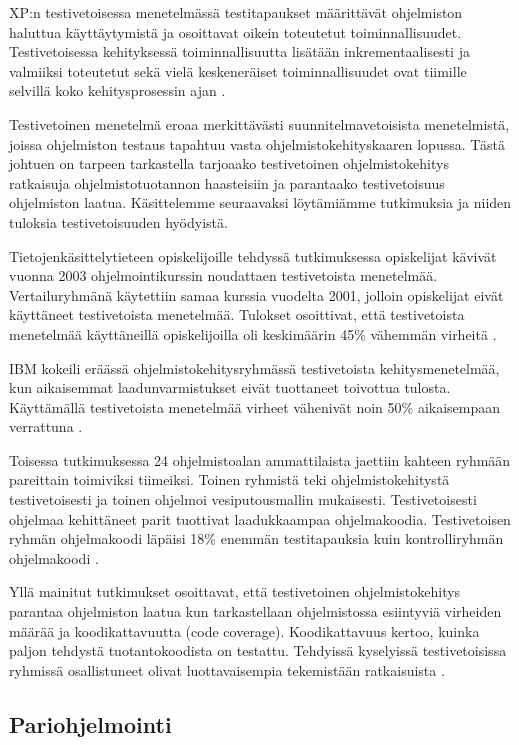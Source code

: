 \documentclass[finnish]{tktltiki2}
\theoremstyle{definition}
\theoremstyle{remark}
\begin{document}
XP:n testivetoisessa menetelmässä testitapaukset määrittävät ohjelmiston haluttua käyttäytymistä ja osoittavat oikein toteutetut toiminnallisuudet. Testivetoisessa kehityksessä toiminnallisuutta lisätään inkrementaalisesti ja valmiiksi toteutetut sekä vielä keskeneräiset toiminnallisuudet ovat tiimille selvillä koko kehitysprosessin ajan \cite{EDW03}.

Testivetoinen menetelmä eroaa merkittävästi suunnitelmavetoisista menetel\-mistä, joissa ohjelmiston testaus tapahtuu vasta ohjelmistokehityskaaren lopussa. Tästä johtuen on tarpeen tarkastella tarjoaako testivetoinen ohjelmistokehitys ratkaisuja ohjelmistotuotannon haasteisiin ja parantaako testivetoisuus ohjelmiston laatua. Käsittelemme seuraavaksi löytämiämme tutkimuksia ja niiden tuloksia testivetoisuuden hyödyistä.

Tietojen\-käsittely\-tieteen opiskelijoille tehdyssä tutkimuksessa opiskelijat kävivät vuonna 2003 ohjelmointikurssin noudattaen testivetoista menetelmää. Vertailuryhmänä käytettiin samaa kurssia vuodelta 2001, jolloin opiskelijat eivät käyttäneet testivetoista menetelmää. Tulokset osoittivat, että testivetoista menetelmää käyttäneillä opiskelijoilla oli keskimäärin 45\% vähemmän virheitä \cite{EDW03}.

IBM kokeili eräässä ohjelmistokehitysryhmässä testivetoista kehitys\-menetelmää, kun aikaisemmat laadunvarmistukset eivät tuottaneet toivottua tulosta. Käyttä\-mällä testivetoista menetelmää virheet vähenivät noin 50\% aikaisempaan verrattuna \cite{MAW03}.

Toisessa tutkimuksessa 24 ohjelmistoalan ammattilaista jaettiin kahteen ryhmään pareittain toimiviksi tiimeiksi. Toinen ryhmistä teki ohjelmistokehitystä testivetoisesti ja toinen ohjelmoi vesiputousmallin mukaisesti. Testivetoisesti ohjelmaa kehittäneet parit tuottivat laadukkaampaa ohjelmakoodia. Testivetoisen ryhmän ohjelmakoodi läpäisi 18\% enemmän testitapauksia kuin kontrolliryhmän ohjelmakoodi \cite{GEW03}.

Yllä mainitut tutkimukset osoittavat, että testivetoinen ohjelmistokehitys parantaa ohjelmiston laatua kun tarkastellaan ohjelmistossa esiintyviä virheiden määrää ja koodikattavuutta (code coverage). Koodikattavuus kertoo, kuinka paljon tehdystä tuotantokoodista on testattu. Tehdyissä kyselyissä testivetoisissa ryhmissä osallistuneet olivat luottavaisempia tekemistään ratkaisuista \cite{GEW03}.

\subsection{Pariohjelmointi}
\end{document}
